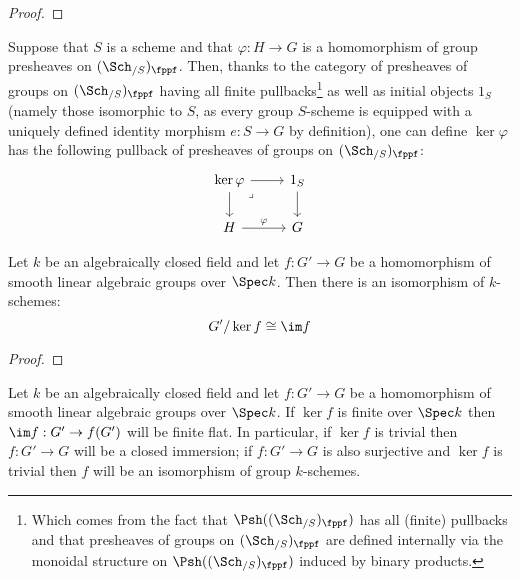                 \begin{proof}
                    
                \end{proof}
            \begin{definition}[Kernels] \label{def: kernels_of_homomorphisms_of_group_schemes}
                Suppose that $S$ is a scheme and that $\varphi: H \to G$ is a homomorphism of group presheaves on $(\Sch_{/S})_{\fppf}$. Then, thanks to the category of presheaves of groups on $(\Sch_{/S})_{\fppf}$ having all finite pullbacks\footnote{Which comes from the fact that $\Psh((\Sch_{/S})_{\fppf})$ has all (finite) pullbacks and that presheaves of groups on $(\Sch_{/S})_{\fppf}$ are defined internally via the monoidal structure on $\Psh((\Sch_{/S})_{\fppf})$ induced by binary products.} as well as initial objects $1_S$ (namely those isomorphic to $S$, as every group $S$-scheme is equipped with a uniquely defined identity morphism $e: S \to G$ by definition), one can define $\ker \varphi$ has the following pullback of presheaves of groups on $(\Sch_{/S})_{\fppf}$:
                    $$
                        \begin{tikzcd}
                        	{\ker \varphi} & {1_S} \\
                        	H & G
                        	\arrow[from=1-2, to=2-2]
                        	\arrow["\varphi", from=2-1, to=2-2]
                        	\arrow[from=1-1, to=2-1]
                        	\arrow[from=1-1, to=1-2]
                        	\arrow["\lrcorner"{anchor=center, pos=0.125}, draw=none, from=1-1, to=2-2]
                        \end{tikzcd}
                    $$
            \end{definition}
            \begin{corollary} \label{coro: first_isomorphism_theorem_for_linear_algebraic_groups}
                Let $k$ be an algebraically closed field and let $f: G' \to G$ be a homomorphism of smooth linear algebraic groups over $\Spec k$. Then there is an isomorphism of $k$-schemes:
                    $$G'/\ker f \cong \im f$$
            \end{corollary}
                \begin{proof}
                    
                \end{proof}
            \begin{proposition} \label{prop: monomorphisms_between_linear_algebraic_groups}
                Let $k$ be an algebraically closed field and let $f: G' \to G$ be a homomorphism of smooth linear algebraic groups over $\Spec k$. If $\ker f$ is finite over $\Spec k$ then $\im f: G' \to f(G')$ will be finite flat. In particular, if $\ker f$ is trivial then $f: G' \to G$ will be a closed immersion; if $f: G' \to G$ is also surjective and $\ker f$ is trivial then $f$ will be an isomorphism of group $k$-schemes.
            \end{proposition}
